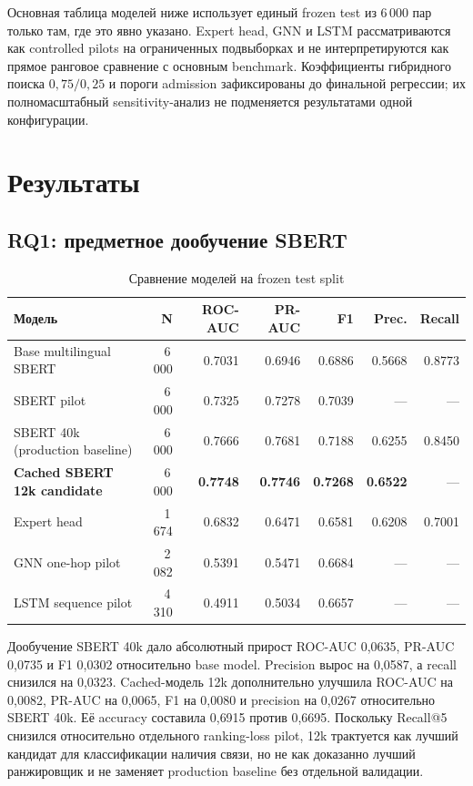 \documentclass[twoside,11pt]{article}
\begin{document}
Основная таблица моделей ниже использует единый frozen test из 6\,000 пар только там, где это явно указано. Expert head, GNN и LSTM рассматриваются как controlled pilots на ограниченных подвыборках и не интерпретируются как прямое ранговое сравнение с основным benchmark. Коэффициенты гибридного поиска $0{,}75/0{,}25$ и пороги admission зафиксированы до финальной регрессии; их полномасштабный sensitivity-анализ не подменяется результатами одной конфигурации.

\section{Результаты}

\subsection{RQ1: предметное дообучение SBERT}

\begin{table}[H]
\centering
\caption{Сравнение моделей на frozen test split}
\label{tab:model-comparison}
\small
\begin{tabular}{lrrrrrr}
\toprule
\textbf{Модель} & \textbf{N} & \textbf{ROC-AUC} & \textbf{PR-AUC} & \textbf{F1} & \textbf{Prec.} & \textbf{Recall}\\
\midrule
Base multilingual SBERT & 6\,000 & 0.7031 & 0.6946 & 0.6886 & 0.5668 & 0.8773\\
SBERT pilot & 6\,000 & 0.7325 & 0.7278 & 0.7039 & --- & ---\\
SBERT 40k (production baseline) & 6\,000 & 0.7666 & 0.7681 & 0.7188 & 0.6255 & 0.8450\\
\textbf{Cached SBERT 12k candidate} & 6\,000 & \textbf{0.7748} & \textbf{0.7746} & \textbf{0.7268} & \textbf{0.6522} & ---\\
Expert head & 1\,674 & 0.6832 & 0.6471 & 0.6581 & 0.6208 & 0.7001\\
GNN one-hop pilot & 2\,082 & 0.5391 & 0.5471 & 0.6684 & --- & ---\\
LSTM sequence pilot & 4\,310 & 0.4911 & 0.5034 & 0.6657 & --- & ---\\
\bottomrule
\end{tabular}
\end{table}

Дообучение SBERT 40k дало абсолютный прирост ROC-AUC 0,0635, PR-AUC 0,0735 и F1 0,0302 относительно base model. Precision вырос на 0,0587, а recall снизился на 0,0323. Cached-модель 12k дополнительно улучшила ROC-AUC на 0,0082, PR-AUC на 0,0065, F1 на 0,0080 и precision на 0,0267 относительно SBERT 40k. Её accuracy составила 0,6915 против 0,6695. Поскольку Recall@5 снизился относительно отдельного ranking-loss pilot, 12k трактуется как лучший кандидат для классификации наличия связи, но не как доказанно лучший ранжировщик и не заменяет production baseline без отдельной валидации.
\end{document}
